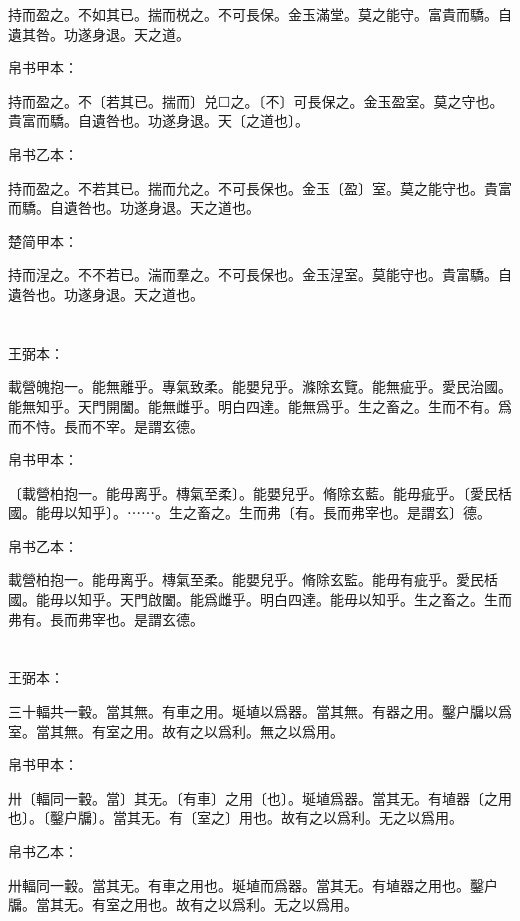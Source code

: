 \documentclass[a5paper]{ctexbook}
\begin{document}
    持而盈之。不如其已。揣而棁之。不可長保。金玉滿堂。莫之能守。富貴而驕。自遺其咎。功遂身退。天之道。

    
    帛书甲本：

    持而盈之。不〔若其已。揣而〕兑☐之。〔不〕可長保之。金玉盈室。莫之守也。貴富而驕。自遺咎也。功遂身退。天〔之道也〕。

    帛书乙本：

    持而盈之。不若其已。揣而允之。不可長保也。金玉〔盈〕室。莫之能守也。貴富而驕。自遺咎也。功遂身退。天之道也。

    楚简甲本：

    持而浧之。不不若已。湍而羣之。不可長保也。金玉浧室。莫能守也。貴富驕。自遺咎也。功遂身退。天之道也。

    \chapter{}
    王弼本：

    載營魄抱一。能無離乎。專氣致柔。能嬰兒乎。滌除玄覽。能無疵乎。愛民治國。能無知乎。天門開闔。能無雌乎。明白四達。能無爲乎。生之畜之。生而不有。爲而不恃。長而不宰。是謂玄德。

    
    帛书甲本：

    〔載營柏抱一。能毋离乎。槫氣至柔〕。能嬰兒乎。脩除玄藍。能毋疵乎。〔愛民栝國。能毋以知乎〕。⋯⋯。生之畜之。生而弗〔有。長而弗宰也。是謂玄〕德。

    帛书乙本：

    載營柏抱一。能毋离乎。槫氣至柔。能嬰兒乎。脩除玄監。能毋有疵乎。愛民栝國。能毋以知乎。天門啟闔。能爲雌乎。明白四達。能毋以知乎。生之畜之。生而弗有。長而弗宰也。是謂玄德。

    \chapter{}
    王弼本：

    三十輻共一轂。當其無。有車之用。埏埴以爲器。當其無。有器之用。鑿户牖以爲室。當其無。有室之用。故有之以爲利。無之以爲用。

    
    帛书甲本：

    卅〔輻同一轂。當〕其无。〔有車〕之用〔也〕。埏埴爲器。當其无。有埴器〔之用也〕。〔鑿户牖〕。當其无。有〔室之〕用也。故有之以爲利。无之以爲用。

    帛书乙本：

    卅輻同一轂。當其无。有車之用也。埏埴而爲器。當其无。有埴器之用也。鑿户牖。當其无。有室之用也。故有之以爲利。无之以爲用。
\end{document}
